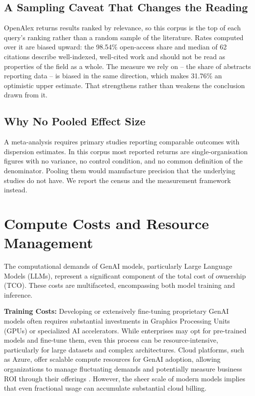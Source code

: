 \documentclass[10pt,journal,compsoc,twocolumn]{IEEEtran}
\begin{document}
\subsection{A Sampling Caveat That Changes the Reading}


OpenAlex returns results ranked by relevance, so this corpus is the top of each query's ranking rather than a random sample of the literature. Rates computed over it are biased upward: the 98.54\% open-access share and median of 62 citations describe well-indexed, well-cited work and should not be read as properties of the field as a whole. The measure we rely on -- the share of abstracts reporting data -- is biased in the same direction, which makes 31.76\% an optimistic upper estimate. That strengthens rather than weakens the conclusion drawn from it.


\subsection{Why No Pooled Effect Size}


A meta-analysis requires primary studies reporting comparable outcomes with dispersion estimates. In this corpus most reported returns are single-organisation figures with no variance, no control condition, and no common definition of the denominator. Pooling them would manufacture precision that the underlying studies do not have. We report the census and the measurement framework instead.



\section{Compute Costs and Resource Management}


The computational demands of GenAI models, particularly Large Language Models (LLMs), represent a significant component of the total cost of ownership (TCO). These costs are multifaceted, encompassing both model training and inference.

\textbf{Training Costs:} Developing or extensively fine-tuning proprietary GenAI models often requires substantial investments in Graphics Processing Units (GPUs) or specialized AI accelerators. While enterprises may opt for pre-trained models and fine-tune them, even this process can be resource-intensive, particularly for large datasets and complex architectures. Cloud platforms, such as Azure, offer scalable compute resources for GenAI adoption, allowing organizations to manage fluctuating demands and potentially measure business ROI through their offerings \cite{openalex_w7138188291}. However, the sheer scale of modern models implies that even fractional usage can accumulate substantial cloud billing.
\end{document}
